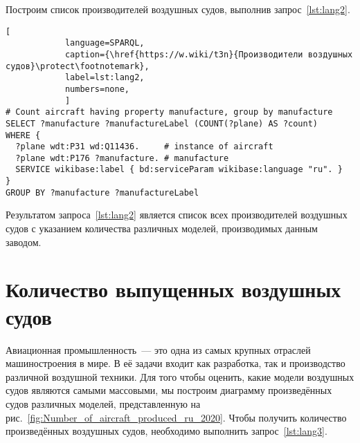 Построим список производителей воздушных судов, выполнив запрос~\ref{lst:lang2}.

\begin{lstlisting}[ 
            language=SPARQL, 
            caption={\href{https://w.wiki/t3n}{Производители воздушных судов}\protect\footnotemark}, 
            label=lst:lang2, 
            numbers=none,
            ]
# Count aircraft having property manufacture, group by manufacture
SELECT ?manufacture ?manufactureLabel (COUNT(?plane) AS ?count) 
WHERE {
  ?plane wdt:P31 wd:Q11436.     # instance of aircraft
  ?plane wdt:P176 ?manufacture. # manufacture
  SERVICE wikibase:label { bd:serviceParam wikibase:language "ru". }
}
GROUP BY ?manufacture ?manufactureLabel
\end{lstlisting}

Результатом запроса~\ref{lst:lang2} является список всех производителей воздушных судов с указанием количества различных моделей, производимых данным заводом.



\section{Количество выпущенных воздушных судов}%

Авиационная промышленность~--- это одна из самых крупных отраслей машиностроения в мире. 
В её задачи входит как разработка, так и производство различной воздушной техники. 
Для того чтобы оценить, какие модели воздушных судов являются самыми массовыми, 
мы построим диаграмму произведённых судов различных моделей, представленную на рис.~\ref{fig:Number_of_aircraft_produced_ru_2020}. 
Чтобы получить количество произведённых воздушных судов, необходимо выполнить запрос~\ref{lst:lang3}.

